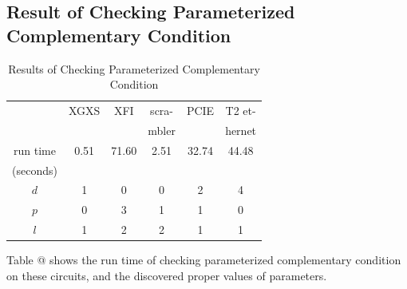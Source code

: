 \documentclass[journal]{IEEEtran}
\makeatletter
\newcommand{\Rmnum}[1]{\expandafter\@slowromancap\romannumeral #1@}
\makeatother
\begin{document}
\subsection{Result of Checking Parameterized Complementary Condition}
\begin{table}[!t]
\centering
\caption{Results of Checking Parameterized Complementary Condition}
\begin{tabular}{|c|c|c|c|c|c|}
\hline
&XGXS&XFI&scra-&PCIE&T2 et-\\
&&&mbler&&hernet\\ \hline
run time&0.51&71.60&2.51&32.74&44.48\\
(seconds)&&&&&\\\hline
$d$      &1       &0     &0         &2   &4          \\ \hline
$p$      &0       &3     &1         &1   &0          \\ \hline
$l$      &1       &2     &2         &1   &1          \\ \hline
\end{tabular}
\end{table}

Table \Rmnum{2} shows the run time of checking parameterized complementary condition on these circuits,
and the discovered proper values of parameters.
\end{document}
